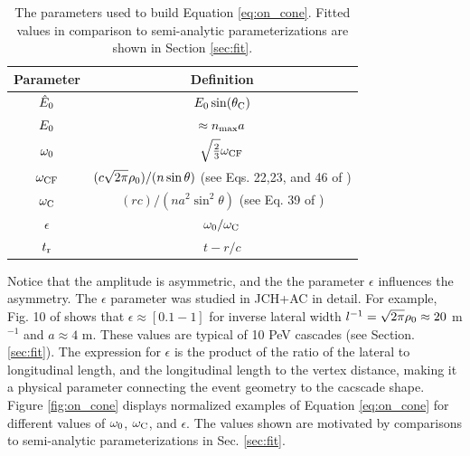 \documentclass[amsmath,amssymb,aps,prd,10pt,twocolumn]{revtex4}
\begin{document}
\begin{table}
\renewcommand{\arraystretch}{1.5}
\begin{tabular}{| c | c |}
\hline
Parameter & Definition \\ \hline
$\hat{E}_{\rm 0}$ & $E_{\rm 0} \sin(\theta_{\rm C})$ \\
$E_{\rm 0}$ & $\approx n_{\rm max}a$ \\
$\omega_{\rm 0}$ & $\sqrt{\frac{2}{3}} \omega_{\rm CF}$ \\
$\omega_{\rm CF}$ & $(c\sqrt{2\pi}\rho_{\rm 0})/(n\sin\theta)$ (see Eqs. 22,23, and 46 of \cite{10.1016/j.astropartphys.2017.03.008}) \\
$\omega_{\rm C}$ & $(rc)/(na^2\sin^2\theta)$ (see Eq. 39 of \cite{10.1016/j.astropartphys.2017.03.008})\\
$\epsilon$ & $\omega_{\rm 0}/\omega_{\rm C}$ \\
$t_{\rm r}$ & $t - r/c$ \\ \hline
\end{tabular}
\caption{\label{tab:features_1} The parameters used to build Equation \ref{eq:on_cone}.  Fitted values in comparison to semi-analytic parameterizations are shown in Section \ref{sec:fit}.}
\end{table} 

Notice that the amplitude is asymmetric, and the the parameter $\epsilon$ influences the asymmetry.  The $\epsilon$ parameter was studied in JCH+AC in detail.  For example, Fig. 10 of \cite{10.1016/j.astropartphys.2017.03.008} shows that $\epsilon \approx [0.1 - 1]$ for inverse lateral width $l^{-1} = \sqrt{2\pi} \rho_{\rm 0} \approx 20$ m$^{-1}$ and $a \approx 4$ m.  These values are typical of 10 PeV cascades (see Section. \ref{sec:fit}).  The expression for $\epsilon$ is the product of the ratio of the lateral to longitudinal length, and the longitudinal length to the vertex distance, making it a physical parameter connecting the event geometry to the cacscade shape.  Figure \ref{fig:on_cone} displays normalized examples of Equation \ref{eq:on_cone} for different values of $\omega_{\rm 0}$, $\omega_{\rm C}$, and $\epsilon$.  The values shown are motivated by comparisons to semi-analytic parameterizations in Sec. \ref{sec:fit}.
\end{document}
